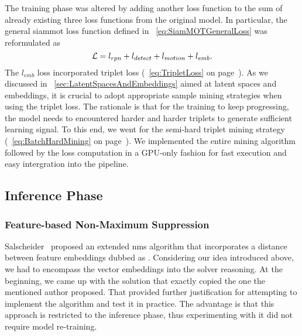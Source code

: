 The training phase was altered by adding another loss function to the sum of already existing three loss functions from the original model. In particular, the general \gls{siammot} loss function defined in \eqtext{}~\ref{eq:SiamMOTGeneralLoss} was reformulated as
\begin{equation}
    \label{eq:SiamMOTFeatureEmbLoss}
    \mathcal{L} = l_{rpn} + l_{detect} + l_{motion} + l_{emb}.
\end{equation}
The $l_{emb}$ loss incorporated triplet loss (\eqtext{}~\ref{eq:TripletLoss} on page~\pageref{eq:TripletLoss}). As we discussed in \sectiontext{}~\ref{sec:LatentSpacesAndEmbeddings} aimed at latent spaces and embeddings, it is crucial to adopt appropriate sample mining strategies when using the triplet loss. The rationale is that for the training to keep progressing, the model needs to encountered harder and harder triplets to generate sufficient learning signal. To this end, we went for the semi-hard triplet mining strategy (\eqtext{}~\ref{eq:BatchHardMining} on page~\pageref{eq:BatchHardMining}). We implemented the entire mining algorithm followed by the loss computation in a GPU-only fashion for fast execution and easy intergration into the pipeline.

\subsection{Inference Phase}

\subsubsection{Feature-based Non-Maximum Suppression}
\label{sssec:FeatureNonMaximumSuppression}

Salscheider~\cite{salscheider2020featurenms} proposed an extended \gls{nms} algorithm that incorporates a distance between feature embeddings dubbed as \featurenms{}. Considering our idea introduced above, we had to encompass the vector embeddings into the solver reasoning. At the beginning, we came up with the solution that exactly copied the one the mentioned author proposed. That provided further justification for attempting to implement the algorithm and test it in practice. The advantage is that this approach is restricted to the inference phase, thus experimenting with it did not require model re-training.

